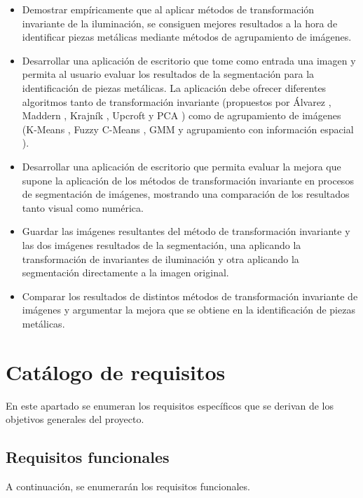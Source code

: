 \begin{itemize}
    \item Demostrar empíricamente que al aplicar métodos de transformación invariante de la iluminación, se consiguen mejores resultados a la hora de identificar piezas metálicas mediante métodos de agrupamiento de imágenes.
    \item Desarrollar una aplicación de escritorio que tome como entrada una imagen y  permita al usuario evaluar los resultados de la segmentación para la identificación de piezas metálicas. La aplicación debe ofrecer diferentes algoritmos tanto de transformación invariante (propuestos por Álvarez \cite{alvarez2011}, Maddern \cite{maddern2014}, Krajník \cite{krajník2015}, Upcroft \cite{upcroft2014} y PCA \cite{pca2017}) como de agrupamiento de imágenes (K-Means \cite{MATLAB:2023bKmeans}, Fuzzy C-Means \cite{MATLAB:2023bFuzzy}, GMM \cite{MATLAB:2023bGMM} y agrupamiento con información espacial \cite{wang2012hmrf}).
    \item Desarrollar una aplicación de escritorio que permita evaluar la mejora que supone la aplicación de los métodos de transformación invariante en procesos de segmentación de imágenes, mostrando una comparación de los resultados tanto visual como numérica.
    \item Guardar las imágenes resultantes del método de transformación invariante y las dos imágenes  resultados de la segmentación, una aplicando la transformación de invariantes de iluminación y otra aplicando la segmentación directamente a la imagen original.
    \item Comparar los resultados de distintos métodos de transformación invariante de imágenes y argumentar la mejora que se obtiene en la identificación de piezas metálicas.
\end{itemize}

\section{Catálogo de requisitos}\label{catalogo-de-requisitos}

En este apartado se enumeran los requisitos específicos que se derivan de los objetivos generales del proyecto.

\subsection{Requisitos funcionales}\label{requisitos-funcionales}

A continuación, se enumerarán los requisitos funcionales.

